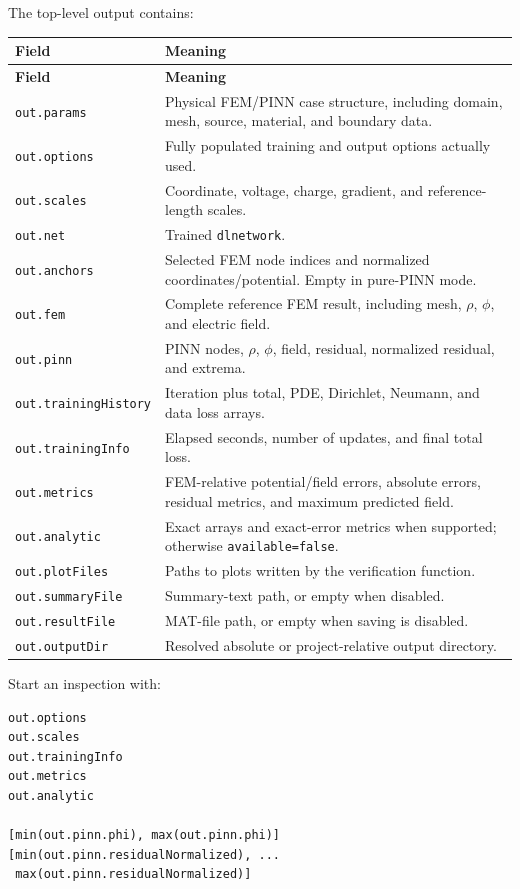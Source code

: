 \documentclass[11pt]{article}
\begin{document}
The top-level output contains:
\begin{longtable}{>{\RaggedRight\arraybackslash}p{} >{\RaggedRight\arraybackslash}p{}}
\toprule
\textbf{Field} & \textbf{Meaning} \\
\midrule
\endfirsthead
\toprule
\textbf{Field} & \textbf{Meaning} \\
\midrule
\endhead
\texttt{out.params} & Physical FEM/PINN case structure, including domain, mesh, source, material, and boundary data. \\
\texttt{out.options} & Fully populated training and output options actually used. \\
\texttt{out.scales} & Coordinate, voltage, charge, gradient, and reference-length scales. \\
\texttt{out.net} & Trained \texttt{dlnetwork}. \\
\texttt{out.anchors} & Selected FEM node indices and normalized coordinates/potential. Empty in pure-PINN mode. \\
\texttt{out.fem} & Complete reference FEM result, including mesh, $\rho$, $\phi$, and electric field. \\
\texttt{out.pinn} & PINN nodes, $\rho$, $\phi$, field, residual, normalized residual, and extrema. \\
\texttt{out.trainingHistory} & Iteration plus total, PDE, Dirichlet, Neumann, and data loss arrays. \\
\texttt{out.trainingInfo} & Elapsed seconds, number of updates, and final total loss. \\
\texttt{out.metrics} & FEM-relative potential/field errors, absolute errors, residual metrics, and maximum predicted field. \\
\texttt{out.analytic} & Exact arrays and exact-error metrics when supported; otherwise \texttt{available=false}. \\
\texttt{out.plotFiles} & Paths to plots written by the verification function. \\
\texttt{out.summaryFile} & Summary-text path, or empty when disabled. \\
\texttt{out.resultFile} & MAT-file path, or empty when saving is disabled. \\
\texttt{out.outputDir} & Resolved absolute or project-relative output directory. \\
\bottomrule
\end{longtable}

Start an inspection with:
\begin{lstlisting}[style=projectmatlab]
out.options
out.scales
out.trainingInfo
out.metrics
out.analytic

[min(out.pinn.phi), max(out.pinn.phi)]
[min(out.pinn.residualNormalized), ...
 max(out.pinn.residualNormalized)]
\end{lstlisting}
\end{document}
